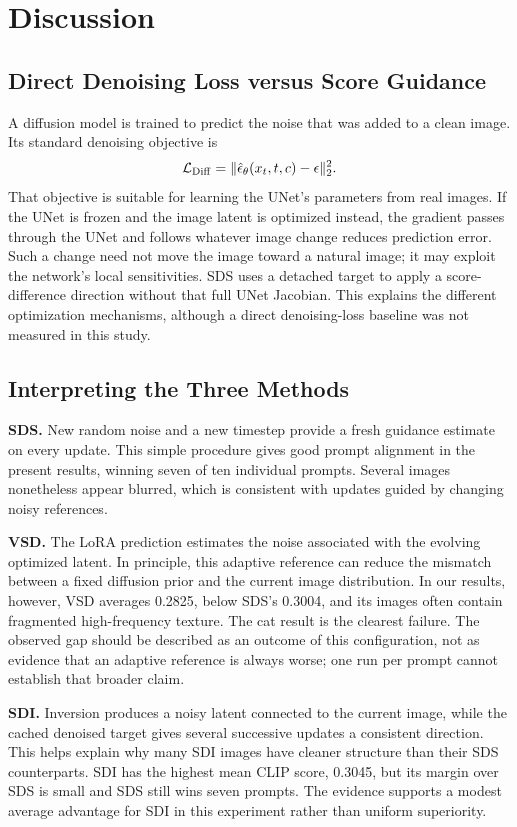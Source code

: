 \section{Discussion}
\label{sec:discussion}

\subsection{Direct Denoising Loss versus Score Guidance}
\label{sec:diff_loss}

A diffusion model is trained to predict the noise that was added to a clean image. Its standard denoising objective is
\begin{equation}
\mathcal L_{\rm Diff}=\|\hat\epsilon_\theta(x_t,t,c)-\epsilon\|_2^2.
\end{equation}
That objective is suitable for learning the UNet's parameters from real images. If the UNet is frozen and the image latent is optimized instead, the gradient passes through the UNet and follows whatever image change reduces prediction error. Such a change need not move the image toward a natural image; it may exploit the network's local sensitivities. SDS uses a detached target to apply a score-difference direction without that full UNet Jacobian. This explains the different optimization mechanisms, although a direct denoising-loss baseline was not measured in this study.

\subsection{Interpreting the Three Methods}
\label{sec:why_better}

\noindent\textbf{SDS.} New random noise and a new timestep provide a fresh guidance estimate on every update. This simple procedure gives good prompt alignment in the present results, winning seven of ten individual prompts. Several images nonetheless appear blurred, which is consistent with updates guided by changing noisy references.

\noindent\textbf{VSD.} The LoRA prediction estimates the noise associated with the evolving optimized latent. In principle, this adaptive reference can reduce the mismatch between a fixed diffusion prior and the current image distribution. In our results, however, VSD averages 0.2825, below SDS's 0.3004, and its images often contain fragmented high-frequency texture. The cat result is the clearest failure. The observed gap should be described as an outcome of this configuration, not as evidence that an adaptive reference is always worse; one run per prompt cannot establish that broader claim.

\noindent\textbf{SDI.} Inversion produces a noisy latent connected to the current image, while the cached denoised target gives several successive updates a consistent direction. This helps explain why many SDI images have cleaner structure than their SDS counterparts. SDI has the highest mean CLIP score, 0.3045, but its margin over SDS is small and SDS still wins seven prompts. The evidence supports a modest average advantage for SDI in this experiment rather than uniform superiority.
